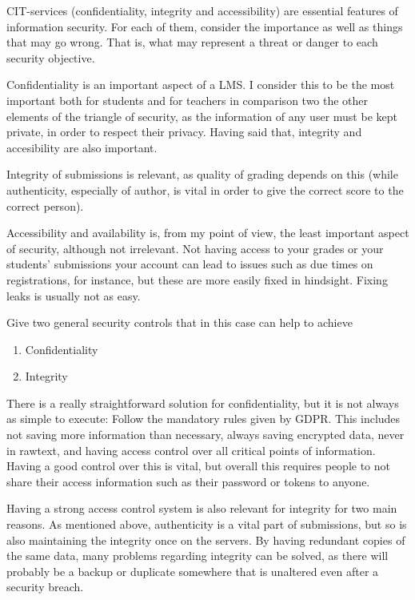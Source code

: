 \documentclass{myassignment}
\begin{document}
	\begin{problem}
		CIT-services (confidentiality, integrity and accessibility) are essential features of information security. For each of them, consider the importance as well as things that may go wrong. That is, what may represent a threat or danger to each security objective.%
	\end{problem}

	\begin{answer}
		Confidentiality is an important aspect of a LMS. I consider this to be the most important both for students and for teachers in comparison two the other elements of the triangle of security, as the information of any user must be kept private, in order to respect their privacy. Having said that, integrity and accesibility are also important.

		Integrity of submissions is relevant, as quality of grading depends on this (while authenticity, especially of author, is vital in order to give the correct score to the correct person).
		
		Accessibility and availability is, from my point of view, the least important aspect of security, although not irrelevant. Not having access to your grades or your students' submissions your account can lead to issues such as due times on registrations, for instance, but these are more easily fixed in hindsight. Fixing leaks is usually not as easy.
	\end{answer}

	\begin{problem}
		Give two general security controls that in this case can help to achieve%
		\begin{enumerate}[label=\alph*),leftmargin=7em]
			\setlength\itemsep{0.5em}
			\item Confidentiality%
			\item Integrity%
		\end{enumerate}
	\end{problem}

	\begin{answer}
		There is a really straightforward solution for confidentiality, but it is not always as simple to execute: Follow the mandatory rules given by GDPR. This includes not saving more information than necessary, always saving encrypted data, never in rawtext, and having access control over all critical points of information. Having a good control over this is vital, but overall this requires people to not share their access information such as their password or tokens  to anyone. 

		Having a strong access control system is also relevant for integrity for two main reasons. As mentioned above, authenticity is a vital part of submissions, but so is also maintaining the integrity once on the servers. By having redundant copies of the same data, many problems regarding integrity can be solved, as there will probably be a backup or duplicate somewhere that is unaltered even after a security breach.
	\end{answer}
\end{document}
